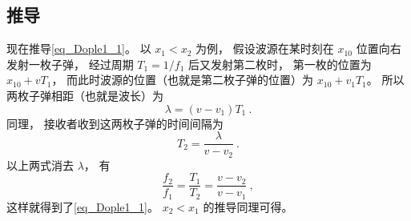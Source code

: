 \subsection{推导}
现在推导\autoref{eq_Dople1_1}。 以 $x_1 < x_2$ 为例， 假设波源在某时刻在 $x_{10}$ 位置向右发射一枚子弹， 经过周期 $T_1 = 1/f_1$ 后又发射第二枚时， 第一枚的位置为 $x_{10} + vT_1$， 而此时波源的位置（也就是第二枚子弹的位置）为 $x_{10} + v_1 T_1$。 所以两枚子弹相距（也就是波长）为
\begin{equation}
\lambda = (v - v_1)T_1~.
\end{equation}
同理， 接收者收到这两枚子弹的时间间隔为
\begin{equation}
T_2 = \frac{\lambda}{v - v_2}~.
\end{equation}
以上两式消去 $\lambda$， 有
\begin{equation}
\frac{f_2}{f_1} = \frac{T_1}{T_2} = \frac{v - v_2}{v - v_1}~,
\end{equation}
这样就得到了\autoref{eq_Dople1_1}。 $x_2 < x_1$ 的推导同理可得。
